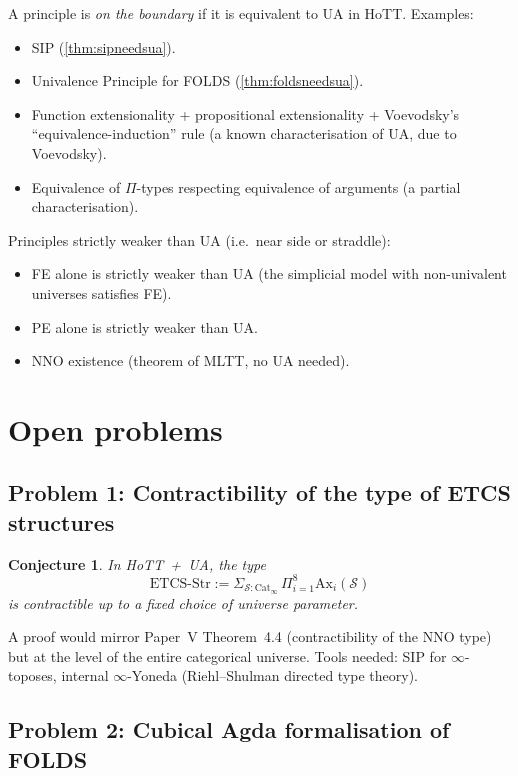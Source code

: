 \documentclass[12pt]{article}
\newtheorem{conjecture}[theorem]{Conjecture}
\theoremstyle{definition}
\theoremstyle{remark}
\begin{document}
A principle is \emph{on the boundary} if it is equivalent to UA in HoTT. Examples:
\begin{itemize}
\item SIP (\cref{thm:sipneedsua}).
\item Univalence Principle for FOLDS (\cref{thm:foldsneedsua}).
\item Function extensionality + propositional extensionality + Voevodsky's
``equivalence-induction'' rule (a known characterisation of UA, due to Voevodsky).
\item Equivalence of $\Pi$-types respecting equivalence of arguments (a partial
characterisation).
\end{itemize}

Principles strictly weaker than UA (i.e.\ near side or straddle):
\begin{itemize}
\item FE alone is strictly weaker than UA (the simplicial model with non-univalent
universes satisfies FE).
\item PE alone is strictly weaker than UA.
\item NNO existence (theorem of MLTT, no UA needed).
\end{itemize}

\section{Open problems}
\label{sec:open}

\subsection{Problem 1: Contractibility of the type of ETCS structures}

\begin{conjecture}
\label{conj:etcscontract}
In HoTT~+~UA, the type
\[
\mathrm{ETCS}\text{-Str} := \Sigma_{\mathcal{S}:\mathrm{Cat}_\infty}\,\Pi_{i=1}^{8}
\mathrm{Ax}_i(\mathcal{S})
\]
is contractible up to a fixed choice of universe parameter.
\end{conjecture}

\noindent A proof would mirror Paper~V Theorem~4.4 (contractibility of the NNO type) but
at the level of the entire categorical universe. Tools needed: SIP for $\infty$-toposes,
internal $\infty$-Yoneda (Riehl--Shulman directed type theory).

\subsection{Problem 2: Cubical Agda formalisation of FOLDS}
\end{document}
